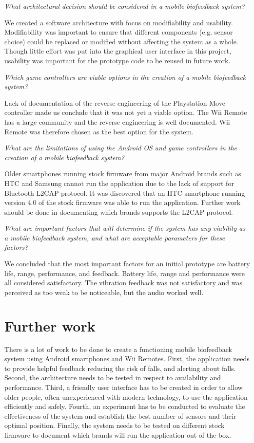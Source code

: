 \textit{What architectural decision should be considered in a mobile biofeedback system?}

We created a software architecture with focus on modifiability and usability. Modifiability was important to ensure that different components (e.g. sensor choice) could be replaced or modified without affecting the system as a whole. Though little effort was put into the graphical user interface in this project, usability was important for the prototype code to be reused in future work. 

\textit{Which game controllers are viable options in the creation of a mobile biofeedback system?}

Lack of documentation of the reverse engineering of the Playstation Move controller made us conclude that it was not yet a viable option. The Wii Remote has a large community and the reverse engineering is well documented. Wii Remote was therefore chosen as the best option for the system.

\textit{What are the limitations of using the Android OS and game controllers in the creation of a mobile biofeedback system?}

Older smartphones running stock firmware from major Android brands such as HTC and Samsung cannot run the application due to the lack of support for Bluetooth L2CAP protocol. It was discovered that an HTC smartphone running version 4.0 of the stock firmware was able to run the application. Further work should be done in documenting which brands supports the L2CAP protocol.


\textit{What are important factors that will determine if the system has any viability as a mobile biofeedback system, and what are acceptable parameters for these factors?}


We concluded that the most important factors for an initial prototype are battery life, range, performance, and feedback. Battery life, range and performance were all considered satisfactory. The vibration feedback was not satisfactory and was perceived as too weak to be noticeable, but the audio worked well.

\section{Further work}
There is a lot of work to be done to create a functioning mobile biofeedback system using Android smartphones and Wii Remotes. First, the application needs to provide helpful feedback reducing the risk of falls, and alerting about falls. Second, the architecture needs to be tested in respect to availability and performance. Third, a friendly user interface has to be created in order to allow older people, often unexperienced with modern technology, to use the application efficiently and safely. Fourth, an experiment has to be conducted to evaluate the effectiveness of the system and establish the best number of sensors and their optimal position. Finally, the system needs to be tested on different stock firmware to document which brands will run the application out of the box.